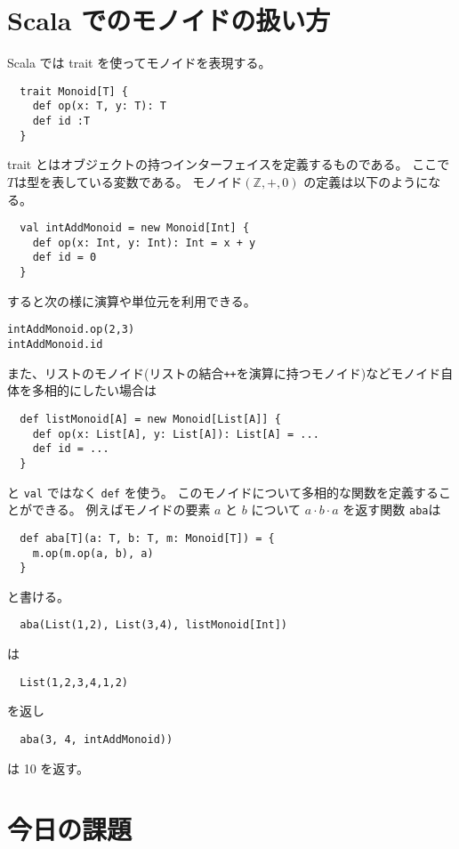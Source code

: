 \documentclass[a4paper,twoside,onecolumn,openany,article]{memoir}
\theoremstyle{remark}
\begin{document}
\section{Scala でのモノイドの扱い方}
Scala では trait を使ってモノイドを表現する。
\begin{verbatim}
  trait Monoid[T] {
    def op(x: T, y: T): T
    def id :T
  }
\end{verbatim}
trait とはオブジェクトの持つインターフェイスを定義するものである。
ここで$T$は型を表している変数である。
モノイド$(\mathbb{Z}, +, 0)$ の定義は以下のようになる。
\begin{verbatim}
  val intAddMonoid = new Monoid[Int] {
    def op(x: Int, y: Int): Int = x + y
    def id = 0
  }
\end{verbatim}
すると次の様に演算や単位元を利用できる。
\begin{verbatim}
intAddMonoid.op(2,3)
intAddMonoid.id
\end{verbatim}
また、リストのモノイド(リストの結合\texttt{++}を演算に持つモノイド)などモノイド自体を多相的にしたい場合は
\begin{verbatim}
  def listMonoid[A] = new Monoid[List[A]] {
    def op(x: List[A], y: List[A]): List[A] = ...
    def id = ...
  }
\end{verbatim}
と \texttt{val} ではなく \texttt{def} を使う。
このモノイドについて多相的な関数を定義することができる。
例えばモノイドの要素 $a$ と $b$ について $a\cdot b\cdot a$ を返す関数 \texttt{aba}は

\begin{verbatim}
  def aba[T](a: T, b: T, m: Monoid[T]) = {
    m.op(m.op(a, b), a)
  }
\end{verbatim}
と書ける。
\begin{verbatim}
  aba(List(1,2), List(3,4), listMonoid[Int])
\end{verbatim}
は
\begin{verbatim}
  List(1,2,3,4,1,2)
\end{verbatim}
を返し
\begin{verbatim}
  aba(3, 4, intAddMonoid))
\end{verbatim}
は 10 を返す。

\section{今日の課題}
\end{document}
